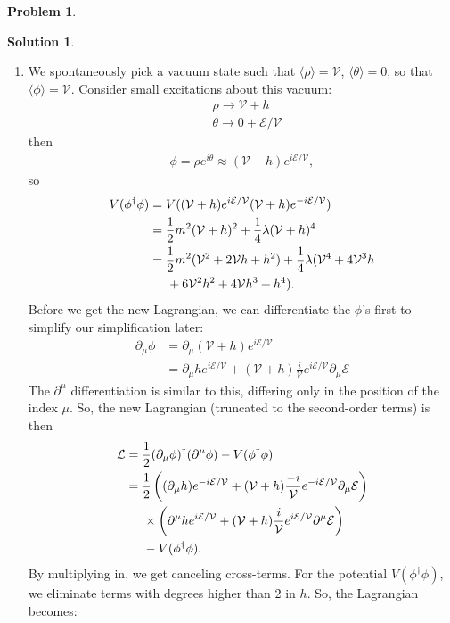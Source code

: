 \documentclass[a4paper,11pt]{article}
\numberwithin{equation}{section}
\theoremstyle{definition}
\newtheorem{prob}{Problem}[section]
\newtheorem{sln}{Solution}[section]
\newcommand{\p}{\partial}
\newcommand{\lag}{\mathcal{L}}
\newcommand{\E}{\mathcal{E}}
\newcommand{\V}{\mathcal{V}}
\begin{document}
\begin{prob}
\begin{sln}
\begin{enumerate}
			\item We spontaneously pick a vacuum state such that $\langle\rho\rangle = \V$, $\langle \theta \rangle = 0$, so that $\langle \phi \rangle = \V$. Consider small excitations about this vacuum: 
			\begin{align}
			&\rho \to \V + h\\
			&\theta \to 0 + \E/\V
			\end{align} 
			then
			\begin{align}
			\phi = \rho e^{i\theta} \approx (\V+h)e^{i\E/\V},
			\end{align}
			so
			\begin{align}
			V(\phi^\dagger\phi) &= V((\V+h)e^{i\E/\V}(\V+h)e^{-i\E/\V})\nonumber\\
			&= \frac{1}{2}m^2(\V + h)^2 + \frac{1}{4}\lambda(\V+h)^4\nonumber\\
			&= \frac{1}{2}m^2(\V^2 + 2\V h + h^2) + \frac{1}{4}\lambda(\V^4 + 4\V^3h\nonumber\\
			&\hspace{0.5cm}+ 6\V^2h^2 + 4\V h^3 + h^4).
			\end{align}
			Before we get the new Lagrangian, we can differentiate the $\phi$'s first to simplify our simplification later:
			\begin{align}
			\p_\mu \phi &= \p_\mu (\V + h)e^{i\E/\V}\nonumber\\
			&= \p_\mu h e^{i\E/\V} + (\V + h)\frac{i}{\V}e^{i\E/\V}\p_\mu\E
			\end{align}
			The $\p^\mu$ differentiation is similar to this, differing only in the position of the index $\mu$. So, the new Lagrangian (truncated to the second-order terms) is then
			\begin{align}
			\lag &= \frac{1}{2}(\p_\mu\phi)^\dagger(\p^\mu \phi) - V(\phi^\dagger\phi)\nonumber\\
			&= \frac{1}{2}\left((\p_\mu h) e^{-i\E/\V} + (\V + h)\frac{-i}{\V}e^{-i\E/\V}\p_\mu\E\right)\nonumber\\
			&\hspace{0.5cm}\times \left(\p^\mu h e^{i\E/\V} + (\V + h)\frac{i}{\V}e^{i\E/\V}\p^\mu\E\right)\nonumber\\
			&\hspace{0.5cm} - V(\phi^\dagger\phi).
			\end{align}
			By multiplying in, we get canceling cross-terms. For the potential $V(\phi^\dagger\phi)$, we eliminate terms with degrees higher than 2 in $h$. So, the Lagrangian becomes:
			\begin{align}

\end{align}
\end{enumerate}
\end{sln}
\end{prob}
\end{document}
